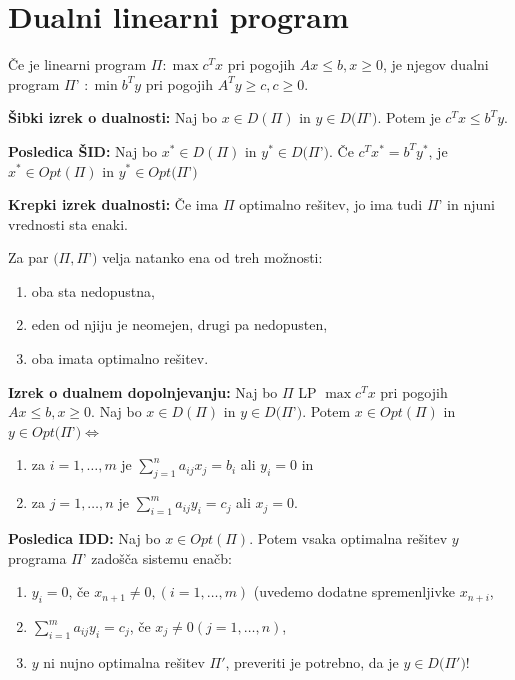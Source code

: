 \documentclass[8pt,a4paper]{amsart}
\theoremstyle{definition} %
\theoremstyle{plain} %
\begin{document}
\thispagestyle{empty}
\setlength{\parindent}{0pt}
\section{Dualni linearni program}

Če je linearni program $\Pi : \max c^Tx$ pri pogojih $Ax\leq b, x\geq 0$, je njegov dualni program $\Pi$' $: \min b^Ty$ pri pogojih $A^Ty \geq c, c\geq 0$.

\textbf{Šibki izrek o dualnosti:} Naj bo $x \in D(\Pi )$ in $y \in D(\Pi $'$)$. Potem je $c^Tx  \leq  b^Ty$.

\textbf{Posledica ŠID:} Naj bo $x^* \in  D(\Pi )$ in $y^* \in D(\Pi $'$)$. Če $c^Tx^*  =  b^Ty^*$, je $x^* \in  Opt(\Pi )$ in $y^* \in Opt(\Pi $'$)$

\textbf{Krepki izrek dualnosti:} Če ima $\Pi$ optimalno rešitev, jo ima tudi $\Pi$' in njuni vrednosti sta enaki.

Za par $(\Pi, \Pi$'$)$ velja natanko ena od treh možnosti:
\begin{enumerate}[i]
\item oba sta nedopustna,
\item eden od njiju je neomejen, drugi pa nedopusten,
\item oba imata optimalno rešitev.
\end{enumerate}

\textbf{Izrek o dualnem dopolnjevanju:} Naj bo $\Pi$ LP $\max c^Tx$ pri pogojih $Ax\leq b, x\geq 0$. Naj bo $x \in D(\Pi )$ in $y \in D(\Pi $'$)$. Potem $x \in  Opt(\Pi )$ in $y \in Opt(\Pi $'$) \Longleftrightarrow$
\begin{enumerate}
\item za $i=1,\ldots ,m$ je $\sum_{j=1}^{n}a_{ij}x_j=b_i$ ali $y_i=0$ in
\item za $j=1,\ldots ,n$ je  $\sum_{i=1}^{m}a_{ij}y_i=c_j$ ali $x_j=0$.
\end{enumerate}

\textbf{Posledica IDD:} Naj bo $x \in  Opt(\Pi )$. Potem vsaka optimalna rešitev $y$ programa $\Pi$' zadošča sistemu enačb:

\begin{enumerate}
\item $y_i=0$, če $x_{n+1} \neq 0, (i=1,\ldots ,m)$ (uvedemo dodatne spremenljivke $x_{n+i}$,
\item $\sum_{i=1}^{m}a_{ij}y_i=c_j$, če $x_j \neq 0 (j=1,\ldots ,n)$,
\item $y$ ni nujno optimalna rešitev $\Pi '$, preveriti je potrebno, da je $y \in D(\Pi '$$)$!
\end{enumerate}
\end{document}
